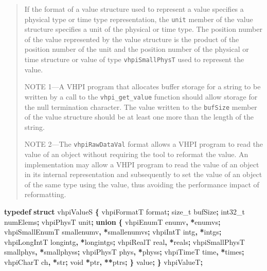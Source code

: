\documentclass[
]{article}
\newenvironment{Shaded}{\begin{snugshade}}{\end{snugshade}}
\newcommand{\DataTypeTok}[1]{\textcolor[rgb]{0.13,0.29,0.53}{#1}}
\newcommand{\KeywordTok}[1]{\textcolor[rgb]{0.13,0.29,0.53}{\textbf{#1}}}
\newcommand{\NormalTok}[1]{#1}
\newcommand{\OperatorTok}[1]{\textcolor[rgb]{0.81,0.36,0.00}{\textbf{#1}}}
\begin{document}
\begin{quote}
If the format of a value structure used to represent a value specifies a physical type or time type representation, the \texttt{unit} member of the value structure specifies a unit of the physical or time type. The position number of the value represented by the value structure is the product of the position number of the unit and the position number of the physical or time structure or value of type \texttt{vhpiSmallPhysT} used to represent the value.

NOTE 1---A VHPI program that allocates buffer storage for a string to be written by a call to the \texttt{vhpi\_get\_value} function should allow storage for the null termination character. The value written to the \texttt{bufSize} member of the value structure should be at least one more than the length of the string.

NOTE 2---The \texttt{vhpiRawDataVal} format allows a VHPI program to read the value of an object without requiring the tool to reformat the value. An implementation may allow a VHPI program to read the value of an object in its internal representation and subsequently to set the value of an object of the same type using the value, thus avoiding the performance impact of reformatting.
\end{quote}

\begin{Shaded}
\begin{Highlighting}[]
\KeywordTok{typedef} \KeywordTok{struct}\NormalTok{ vhpiValueS }\OperatorTok{\{}
\NormalTok{  vhpiFormatT format}\OperatorTok{;}
  \DataTypeTok{size\_t}\NormalTok{ bufSize}\OperatorTok{;}
  \DataTypeTok{int32\_t}\NormalTok{ numElems}\OperatorTok{;}
\NormalTok{  vhpiPhysT unit}\OperatorTok{;}
  \KeywordTok{union} \OperatorTok{\{}
\NormalTok{    vhpiEnumT      enumv}\OperatorTok{,}      \OperatorTok{*}\NormalTok{enumvs}\OperatorTok{;}
\NormalTok{    vhpiSmallEnumT smallenumv}\OperatorTok{,} \OperatorTok{*}\NormalTok{smallenumvs}\OperatorTok{;}
\NormalTok{    vhpiIntT       intg}\OperatorTok{,}       \OperatorTok{*}\NormalTok{intgs}\OperatorTok{;}
\NormalTok{    vhpiLongIntT   longintg}\OperatorTok{,}   \OperatorTok{*}\NormalTok{longintgs}\OperatorTok{;}
\NormalTok{    vhpiRealT      real}\OperatorTok{,}       \OperatorTok{*}\NormalTok{reals}\OperatorTok{;}
\NormalTok{    vhpiSmallPhysT smallphys}\OperatorTok{,}  \OperatorTok{*}\NormalTok{smallphyss}\OperatorTok{;}
\NormalTok{    vhpiPhysT      phys}\OperatorTok{,}       \OperatorTok{*}\NormalTok{physs}\OperatorTok{;}
\NormalTok{    vhpiTimeT      time}\OperatorTok{,}       \OperatorTok{*}\NormalTok{times}\OperatorTok{;}
\NormalTok{    vhpiCharT      ch}\OperatorTok{,}         \OperatorTok{*}\NormalTok{str}\OperatorTok{;}
    \DataTypeTok{void}           \OperatorTok{*}\NormalTok{ptr}\OperatorTok{,}       \OperatorTok{**}\NormalTok{ptrs}\OperatorTok{;}
  \OperatorTok{\}}\NormalTok{ value}\OperatorTok{;}
\OperatorTok{\}}\NormalTok{ vhpiValueT}\OperatorTok{;}
\end{Highlighting}
\end{Shaded}
\end{document}
